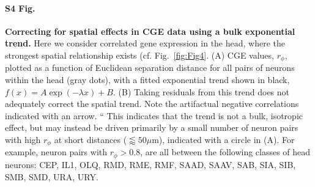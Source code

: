 \documentclass[10pt,letterpaper]{article}
\begin{document}
\paragraph*{S4 Fig.}
\label{S4_Fig}
{\bf Correcting for spatial effects in CGE data using a bulk exponential trend.}
  Here we consider correlated gene expression in the head, where the strongest spatial relationship exists (cf. Fig.~\ref{fig:Fig4}. (A) CGE values, $r_\phi$, plotted as a function of Euclidean separation distance for all pairs of neurons within the head (gray dots), with a fitted exponential trend shown in black, $f(x) = A\exp(-\lambda x) + B$.
(B) Taking residuals from this trend does not adequately correct the spatial trend.
    Note the artifactual negative correlations indicated with an arrow.
    “ This indicates that the trend is not a bulk, isotropic effect, but may instead be driven primarily by a small number of neuron pairs with high $r_\phi$ at short distances ($\lessapprox 50\mu$m), indicated with a circle in (A).
    \color{teal}
For example, neuron pairs with $r_\phi > 0.8$, are all between the following classes of head neurons: CEP, IL1, OLQ, RMD, RME, RMF, SAAD, SAAV, SAB, SIA, SIB, SMB, SMD, URA, URY.
\color{black}



\end{document}
